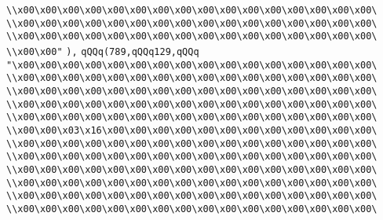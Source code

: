 \verb|\\x00\x00\x00\x00\x00\x00\x00\x00\x00\x00\x00\x00\x00\x00\x00\x00\|\newline
\verb|\\x00\x00\x00\x00\x00\x00\x00\x00\x00\x00\x00\x00\x00\x00\x00\x00\|\newline
\verb|\\x00\x00\x00\x00\x00\x00\x00\x00\x00\x00\x00\x00\x00\x00\x00\x00\|\newline
\verb|\\x00\x00"|\newline
\verb|),|\newline
\verb|qQQq(789,qQQq129,qQQq|\newline
\verb|"\x00\x00\x00\x00\x00\x00\x00\x00\x00\x00\x00\x00\x00\x00\x00\x00\|\newline
\verb|\\x00\x00\x00\x00\x00\x00\x00\x00\x00\x00\x00\x00\x00\x00\x00\x00\|\newline
\verb|\\x00\x00\x00\x00\x00\x00\x00\x00\x00\x00\x00\x00\x00\x00\x00\x00\|\newline
\verb|\\x00\x00\x00\x00\x00\x00\x00\x00\x00\x00\x00\x00\x00\x00\x00\x00\|\newline
\verb|\\x00\x00\x00\x00\x00\x00\x00\x00\x00\x00\x00\x00\x00\x00\x00\x00\|\newline
\verb|\\x00\x00\x03\x16\x00\x00\x00\x00\x00\x00\x00\x00\x00\x00\x00\x00\|\newline
\verb|\\x00\x00\x00\x00\x00\x00\x00\x00\x00\x00\x00\x00\x00\x00\x00\x00\|\newline
\verb|\\x00\x00\x00\x00\x00\x00\x00\x00\x00\x00\x00\x00\x00\x00\x00\x00\|\newline
\verb|\\x00\x00\x00\x00\x00\x00\x00\x00\x00\x00\x00\x00\x00\x00\x00\x00\|\newline
\verb|\\x00\x00\x00\x00\x00\x00\x00\x00\x00\x00\x00\x00\x00\x00\x00\x00\|\newline
\verb|\\x00\x00\x00\x00\x00\x00\x00\x00\x00\x00\x00\x00\x00\x00\x00\x00\|\newline
\verb|\\x00\x00\x00\x00\x00\x00\x00\x00\x00\x00\x00\x00\x00\x00\x00\x00\|\newline
